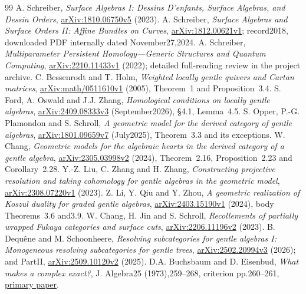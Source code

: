 \begin{thebibliography}{99}
 A. Schreiber, \emph{Surface Algebras I: Dessins D'enfants, Surface Algebras, and Dessin Orders}, \href{https://arxiv.org/abs/1810.06750v5}{arXiv:1810.06750v5} (2023).
 A. Schreiber, \emph{Surface Algebras and Surface Orders II: Affine Bundles on Curves}, \href{https://arxiv.org/abs/1812.00621v1}{arXiv:1812.00621v1}; record2018, downloaded PDF internally dated November27,2024.
 A. Schreiber, \emph{Multiparameter Persistent Homology---Generic Structures and Quantum Computing}, \href{https://arxiv.org/abs/2210.11433v1}{arXiv:2210.11433v1} (2022); detailed full-reading review in the project archive.
 C. Bessenrodt and T. Holm, \emph{Weighted locally gentle quivers and Cartan matrices}, \href{https://arxiv.org/abs/math/0511610v1}{arXiv:math/0511610v1} (2005), Theorem~1 and Proposition~3.4.
 S. Ford, A. Oswald and J.J. Zhang, \emph{Homological conditions on locally gentle algebras}, \href{https://arxiv.org/abs/2409.08333v3}{arXiv:2409.08333v3} (September2026), \S4.1, Lemma~4.5.
 S. Opper, P.-G. Plamondon and S. Schroll, \emph{A geometric model for the derived category of gentle algebras}, \href{https://arxiv.org/abs/1801.09659v7}{arXiv:1801.09659v7} (July2025), Theorem~3.3 and its exceptions.
 W. Chang, \emph{Geometric models for the algebraic hearts in the derived category of a gentle algebra}, \href{https://arxiv.org/abs/2305.03998v2}{arXiv:2305.03998v2} (2024), Theorem~2.16, Proposition~2.23 and Corollary~2.28.
 Y.-Z. Liu, C. Zhang and H. Zhang, \emph{Constructing projective resolution and taking cohomology for gentle algebras in the geometric model}, \href{https://arxiv.org/abs/2308.07220v1}{arXiv:2308.07220v1} (2023).
 Z. Li, Y. Qiu and Y. Zhou, \emph{A geometric realization of Koszul duality for graded gentle algebras}, \href{https://arxiv.org/abs/2403.15190v1}{arXiv:2403.15190v1} (2024), body Theorems~3.6 and3.9.
 W. Chang, H. Jin and S. Schroll, \emph{Recollements of partially wrapped Fukaya categories and surface cuts}, \href{https://arxiv.org/abs/2206.11196v2}{arXiv:2206.11196v2} (2023).
 B. Dequ\^ene and M. Schoonheere, \emph{Resolving subcategories for gentle algebras I: Monogeneous resolving subcategories for gentle trees}, \href{https://arxiv.org/abs/2502.20994v3}{arXiv:2502.20994v3} (2026); and PartII, \href{https://arxiv.org/abs/2509.10120v2}{arXiv:2509.10120v2} (2025).
 D.A. Buchsbaum and D. Eisenbud, \emph{What makes a complex exact?}, J. Algebra25 (1973),259--268, criterion pp.260--261, \href{https://eisenbud.github.io/papers/pdfs/1973-002.pdf}{primary paper}.

\end{thebibliography}
